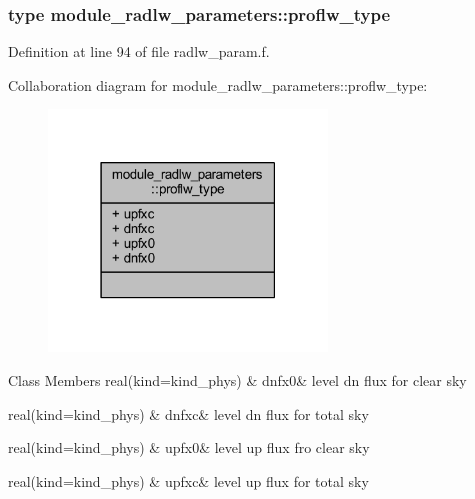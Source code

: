 \subsubsection{type module\+\_\+radlw\+\_\+parameters\+:\+:proflw\+\_\+type}


Definition at line 94 of file radlw\+\_\+param.\+f.



Collaboration diagram for module\+\_\+radlw\+\_\+parameters\+:\+:proflw\+\_\+type\+:\nopagebreak
\begin{figure}[H]
\begin{center}
\leavevmode
\includegraphics[width=210pt]{structmodule__radlw__parameters_1_1proflw__type__coll__graph}
\end{center}
\end{figure}
\begin{DoxyFields}{Class Members}
real(kind=kind\+\_\+phys)\hypertarget{namespacemodule__radlw__parameters_a4804a215b761165846e87428b3f3c12c}{}\label{namespacemodule__radlw__parameters_a4804a215b761165846e87428b3f3c12c}
&
dnfx0&
level dn flux for clear sky \\
\hline

real(kind=kind\+\_\+phys)\hypertarget{namespacemodule__radlw__parameters_a5f7ae4abe7912e8dbe371b577ba91945}{}\label{namespacemodule__radlw__parameters_a5f7ae4abe7912e8dbe371b577ba91945}
&
dnfxc&
level dn flux for total sky \\
\hline

real(kind=kind\+\_\+phys)\hypertarget{namespacemodule__radlw__parameters_a90ec3938bb024acfd6f78d597890e78a}{}\label{namespacemodule__radlw__parameters_a90ec3938bb024acfd6f78d597890e78a}
&
upfx0&
level up flux fro clear sky \\
\hline

real(kind=kind\+\_\+phys)\hypertarget{namespacemodule__radlw__parameters_aefd4bfa2053b7e88173ac73ca219a9b2}{}\label{namespacemodule__radlw__parameters_aefd4bfa2053b7e88173ac73ca219a9b2}
&
upfxc&
level up flux for total sky \\
\hline

\end{DoxyFields}
